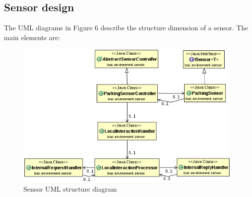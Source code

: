 \documentclass[11pt]{article}
\begin{document}
\subsection{Sensor design}
The UML diagrams in Figure 6 describe the structure dimension of a sensor. The main elements are:
\begin{figure}
  \centering
	\includegraphics[scale=0.8]{sensorUML}
  \caption{Sensor UML structure diagram}
\end{figure}
\end{document}
